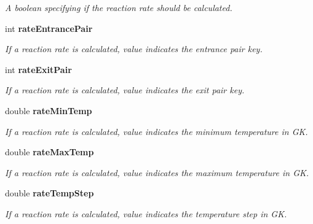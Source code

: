 \begin{CompactItemize}
\begin{CompactList}\small\item\em A boolean specifying if the reaction rate should be calculated. \item\end{CompactList}\item 
int \bf{rate\-Entrance\-Pair}\label{structConfig_b7be0f5b262206071db9a59bfaf26659}

\begin{CompactList}\small\item\em If a reaction rate is calculated, value indicates the entrance pair key. \item\end{CompactList}\item 
int \bf{rate\-Exit\-Pair}\label{structConfig_443086aa534c84f2ca499d5a9e8ce2e0}

\begin{CompactList}\small\item\em If a reaction rate is calculated, value indicates the exit pair key. \item\end{CompactList}\item 
double \bf{rate\-Min\-Temp}\label{structConfig_de4858c442059530d6693fcaba637422}

\begin{CompactList}\small\item\em If a reaction rate is calculated, value indicates the minimum temperature in GK. \item\end{CompactList}\item 
double \bf{rate\-Max\-Temp}\label{structConfig_a2eba1530b0c79f4ccd832d19d2022c8}

\begin{CompactList}\small\item\em If a reaction rate is calculated, value indicates the maximum temperature in GK. \item\end{CompactList}\item 
double \bf{rate\-Temp\-Step}\label{structConfig_0a35e5393e7025d9876b1120b8036376}

\begin{CompactList}\small\item\em If a reaction rate is calculated, value indicates the temperature step in GK. \item\end{CompactList}\end{CompactItemize}
